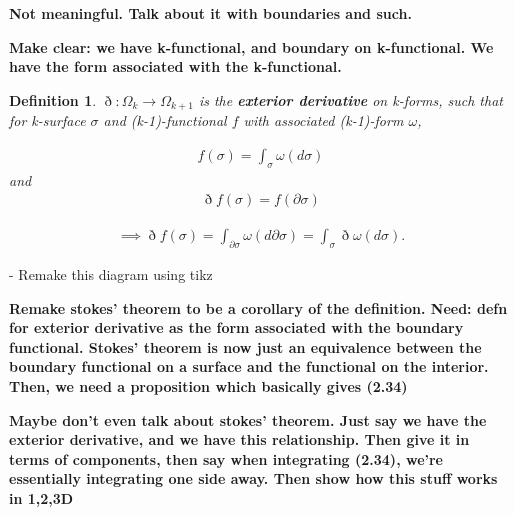 \documentclass{book}
\newtheorem{defn}[equation]{Definition}
\begin{document}
\textbf{Not meaningful. Talk about it with boundaries and such.}

\textbf{Make clear: we have k-functional, and boundary on k-functional. We have the form associated with the k-functional. }
\begin{defn}
	$\eth : \Omega_k \to \Omega_{k+1}$ is the \textbf{exterior derivative} on k-forms, such that for k-surface $\sigma$ and (k-1)-functional $f$ with associated (k-1)-form $\omega$, 
	
	\begin{gather}f(\sigma) = \int_{\sigma}\omega(d\sigma)\end{gather} and \begin{gather} \eth f(\sigma) = f(\partial\sigma) \end{gather}
	
	\begin{gather}\implies \eth f(\sigma) = \int_{\partial\sigma} \omega(d\partial\sigma) = \int_{\sigma} \eth\omega(d\sigma).\end{gather} 
\end{defn}




 
 
 
 
 
 



- Remake this diagram using tikz

\textbf{Remake stokes' theorem to be a corollary of the definition. Need: defn for exterior derivative as the form associated with the boundary functional. Stokes' theorem is now just an equivalence between the boundary functional on a surface and the functional on the interior. Then, we need a proposition which basically gives (2.34)}

\textbf{Maybe don't even talk about stokes' theorem. Just say we have the exterior derivative, and we have this relationship. Then give it in terms of components, then say when integrating (2.34), we're essentially integrating one side away. Then show how this stuff works in 1,2,3D}
\end{document}
